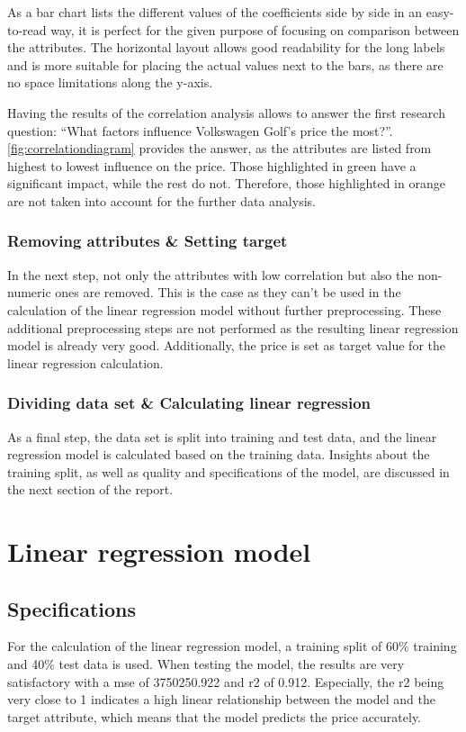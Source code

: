 As a bar chart lists the different values of the coefficients side by side in an easy-to-read way, it is perfect for the 
given purpose of focusing on comparison between the attributes. 
The horizontal layout allows good readability for the long labels and is more suitable for placing the actual values next to the
bars, as there are no space limitations along the y-axis. 
\par
Having the results of the correlation analysis allows to answer the first research question: \enquote{What factors influence Volkswagen Golf's price the most?}.
\autoref{fig:correlationdiagram} provides the answer, as the attributes are listed from highest to lowest influence on the price. Those highlighted in green
have a significant impact, while the rest do not. Therefore, those highlighted in orange are not taken into account for the further data analysis.

\subsubsection{Removing attributes \& Setting target}
In the next step, not only the attributes with low correlation but also the non-numeric ones are removed. This is the case as they can't be used in the calculation
of the linear regression model without further preprocessing. These additional preprocessing steps are not performed as the resulting linear regression
model is already very good. 
Additionally, the price is set as target value for the linear regression calculation.

\subsubsection{Dividing data set \& Calculating linear regression}
As a final step, the data set is split into training and test data, and the linear regression model is calculated based on the
training data. Insights about the training split, as well as quality and specifications of the model, are discussed in the next section of the report. 

\section{Linear regression model}
\subsection{Specifications}
For the calculation of the linear regression model, a training split of 60\% training and 40\% test data is used.
When testing the model, the results are very satisfactory with a \ac{mse} of 3750250.922 and \ac{r2} of 0.912.
Especially, the \ac{r2} being very close to 1 indicates a high linear relationship between the model and the target attribute,
which means that the model predicts the price accurately.

